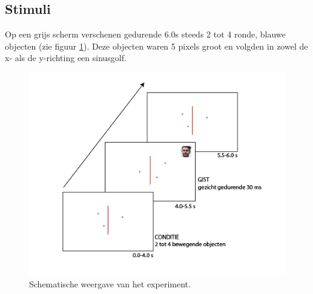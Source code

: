 \documentclass[a4paper,jou]{apa6}  %
\begin{document}
\subsection{Stimuli} Op een grijs scherm verschenen gedurende 6.0s steeds 2 tot 4 ronde, blauwe objecten (zie figuur \ref{fig:tijdlijnExperiment}). Deze objecten waren 5 pixels groot en volgden in zowel de x- als de y-richting een sinusgolf. 
\begin{figure}
\centering
	\includegraphics[width=1.0\linewidth]{Methode.png}
    \caption{\label{fig:tijdlijnExperiment}Schematische weergave van het experiment.}
\end{figure}
\end{document}
